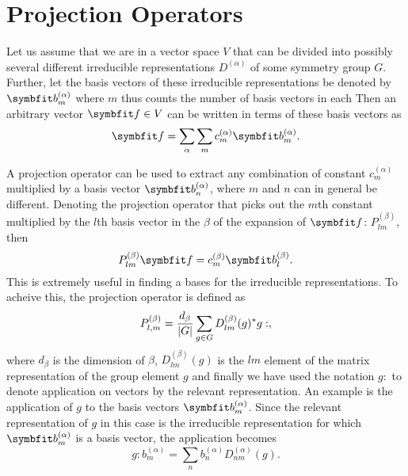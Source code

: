 \section{Projection Operators}
\label{sec:Group:Pro}

Let us assume that we are in a vector space $V$ that can be divided into possibly several different irreducible representations $D^{(\alpha)}$ of some
symmetry group $G$. Further, let the basis vectors of these irreducible representations be denoted by $\v{b}^{(\alpha)}_m$ where $m$ thus counts the number
of basis vectors in each \irr Then an arbitrary vector $\v{f}\in V$ can be written in terms of these basis vectors as
\begin{equation}
    \label{eq:Group:Irr:Pro:basisDecomp}
    \v{f} = \sum_\alpha\sum_m c_m^{(\alpha)}\v{b}^{(\alpha)}_m.
\end{equation}

A projection operator can be used to extract any combination of constant $c_m^{(\alpha)}$ multiplied by a basis vector $\v{b}^{(\alpha)}_n$, where
$m$ and $n$ can in general be different. Denoting the projection operator that picks out the $m$th constant multiplied by the $l$th basis vector
in the \irr $\beta$ of the expansion of $\v{f}$: $P^{(\beta)}_{lm}$, then
\begin{equation}
    \label{eq:Group:Irr:Pro:generalProApplication}
    P^{(\beta)}_{lm}\v{f} = c_m^{(\beta)}\v{b}_l^{(\beta)}.
\end{equation}
This is extremely useful in finding a bases for the irreducible representations.
To acheive this, the projection operator is defined as
\begin{equation}
    \label{eq:Group:Irr:Pro:proOpDef}
    P^{(\beta)}_{l,m} = \frac{d_\beta}{\lvert G \rvert}\sum_{g\in G}D_{lm}^{(\beta)}(g)^\ast g:,
\end{equation}
where $d_\beta$ is the dimension of \irr $\beta$, $D_{lm}^{(\beta)}(g)$ is the $lm$ element of the matrix representation of the group element $g$ and
finally we have used the notation $g:$ to denote application on vectors by the relevant representation. An example is the application of $g$ to the
basis vectors $\v{b}_m^{(\alpha)}$. Since the relevant representation of $g$ in this case is the irreducible representation for which $\v{b}_m^{(\alpha)}$ is
a basis vector, the application becomes
\begin{equation}
    \label{eq:Group:Irr:Pro:gApplication}
    g : b_m^{(\alpha)} = \sum_nb_n^{(\alpha)}D_{nm}^{(\alpha)}(g).
\end{equation}

